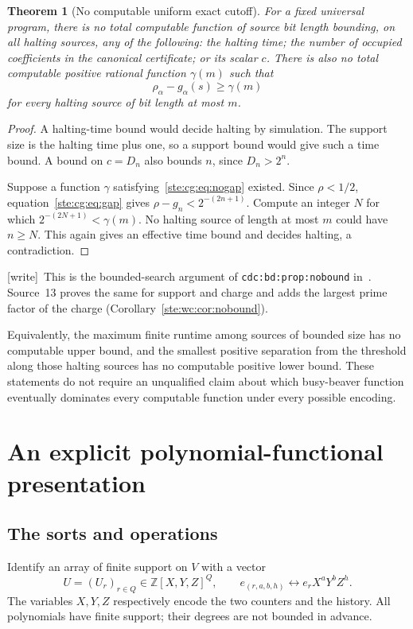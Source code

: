 \documentclass[11pt,letterpaper]{article}
\newtheorem{theorem}{Theorem}[section]
\theoremstyle{definition}
\theoremstyle{remark}
\newcommand{\Z}{\mathbb Z}
\newcommand{\wtag}{\textup{[write]}}
\begin{document}
\begin{theorem}[No computable uniform exact cutoff]\label{ste:cg:thm:nocutoff}
For a fixed universal program, there is no total computable function of
source bit length bounding, on all halting sources, any of the following:
the halting time; the number of occupied coefficients in the canonical
certificate; or its scalar $c$. There is also no total computable positive
rational function $\gamma(m)$ such that
\begin{equation}\label{ste:cg:eq:nogap}
 \rho_\alpha-g_\alpha(s)\ge\gamma(m)
\end{equation}
for every halting source of bit length at most $m$.
\end{theorem}
\begin{proof}
A halting-time bound would decide halting by simulation. The support size
is the halting time plus one, so a support bound would give such a time
bound. A bound on $c=D_n$ also bounds $n$, since $D_n>2^n$.

Suppose a function $\gamma$ satisfying~\eqref{ste:cg:eq:nogap} existed. Since
$\rho<1/2$, equation~\eqref{ste:cg:eq:gap} gives
$\rho-g_n<2^{-(2n+1)}$. Compute an integer $N$ for which
$2^{-(2N+1)}<\gamma(m)$. No halting source of length at most $m$ could
have $n\ge N$. This again gives an effective time bound and decides
halting, a contradiction.
\end{proof}

\wtag\ This is the bounded-search argument of \texttt{cdc:bd:prop:nobound} in~\cite{cdc}. Source~13 proves the same for support and charge and adds the largest prime factor of the charge (Corollary~\ref{ste:wc:cor:nobound}).


Equivalently, the maximum finite runtime among sources of bounded size
has no computable upper bound, and the smallest positive separation from
the threshold along those halting sources has no computable positive
lower bound. These statements do not require an unqualified claim about
which busy-beaver function eventually dominates every computable function
under every possible encoding.

\section{An explicit polynomial-functional presentation}\label{ste:cg:sec:polynomial}
\subsection{The sorts and operations}
Identify an array of finite support on $V$ with a vector
\begin{equation}\label{ste:cg:eq:polyencoding}
 U=(U_r)_{r\in Q}\in\Z[X,Y,Z]^Q,
 \qquad e_{(r,a,b,h)}\longleftrightarrow e_r X^aY^bZ^h.
\end{equation}
The variables $X,Y,Z$ respectively encode the two counters and the history.
All polynomials have finite support; their degrees are not bounded in
advance.
\end{document}
